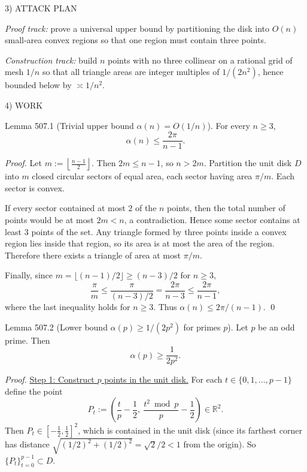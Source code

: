 3) ATTACK PLAN

\emph{Proof track:} prove a universal upper bound by partitioning the disk into $O(n)$ small-area convex regions so that one region must contain three points.

\emph{Construction track:} build $n$ points with no three collinear on a rational grid of mesh $1/n$ so that all triangle areas are integer multiples of $1/(2n^2)$, hence bounded below by $\asymp 1/n^2$.

4) WORK

Lemma 507.1 (Trivial upper bound $\alpha(n)=O(1/n)$).
For every $n\ge 3$,
\[
\alpha(n)\le \frac{2\pi}{n-1}.
\]

\emph{Proof.}
Let $m:=\left\lfloor\frac{n-1}{2}\right\rfloor$.
Then $2m\le n-1$, so $n>2m$.
Partition the unit disk $D$ into $m$ closed circular sectors of equal area, each sector having area $\pi/m$.
Each sector is convex.

If every sector contained at most $2$ of the $n$ points, then the total number of points would be at most $2m<n$, a contradiction.
Hence some sector contains at least $3$ points of the set.
Any triangle formed by three points inside a convex region lies inside that region, so its area is at most the area of the region.
Therefore there exists a triangle of area at most $\pi/m$.

Finally, since $m=\lfloor (n-1)/2\rfloor \ge (n-3)/2$ for $n\ge 3$,
\[
\frac{\pi}{m}\le \frac{\pi}{(n-3)/2}=\frac{2\pi}{n-3}\le \frac{2\pi}{n-1},
\]
where the last inequality holds for $n\ge 3$.
Thus $\alpha(n)\le 2\pi/(n-1)$.
\qed

Lemma 507.2 (Lower bound $\alpha(p)\ge 1/(2p^2)$ for primes $p$).
Let $p$ be an odd prime. Then
\[
\alpha(p)\ge \frac{1}{2p^2}.
\]

\emph{Proof.}
\underline{Step 1: Construct $p$ points in the unit disk.}
For each $t\in\{0,1,\dots,p-1\}$ define the point
\[
P_t:=\left(\frac{t}{p}-\frac12,\ \frac{t^2\bmod p}{p}-\frac12\right)\in\mathbb R^2.
\]
Then $P_t\in[-\tfrac12,\tfrac12]^2$, which is contained in the unit disk (since its farthest corner has distance $\sqrt{(1/2)^2+(1/2)^2}=\sqrt2/2<1$ from the origin).
So $\{P_t\}_{t=0}^{p-1}\subset D$.


